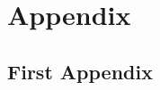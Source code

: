 \appendix
\chapter*{Appendix}
\renewcommand{\thesection}{\Alph{section}}

\section{First Appendix}
\label{sec:ap_first}
\blindtext
